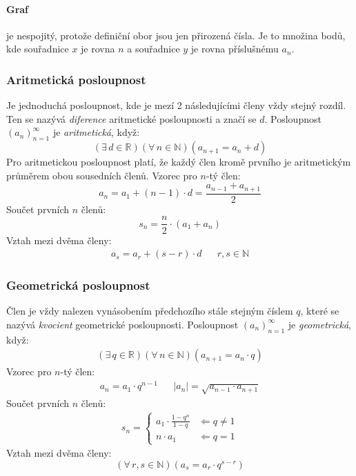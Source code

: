 \documentclass[12pt]{article}
\begin{document}
\paragraph{Graf} je nespojitý, protože definiční obor jsou jen přirozená čísla. Je to množina bodů, kde souřadnice $x$ je rovna $n$ a souřadnice $y$ je rovna příslušnému $a_n$.
\subsubsection{Aritmetická posloupnost}
Je jednoduchá posloupnost, kde je mezí 2 následujícími členy vždy stejný rozdíl. Ten se nazývá \emph{diference} aritmetické posloupnosti a značí se $d$. Posloupnost $ \left( a_n \right)_{n=1}^{\infty}$ je \emph{aritmetická}, když:
\begin{equation}
\left( \exists \, d \in \mathbb{R} \right) \left( \forall \, n \in \mathbb{N} \right) \left( a_{n+1} = a_n + d \right)
\end{equation}
Pro aritmetickou posloupnost platí, že každý člen kromě prvního je aritmetickým průměrem obou sousedních členů. Vzorec pro $n$-tý člen:
\begin{equation}
a_n = a_1 + (n-1) \cdot d = \frac{a_{n-1} + a_{n+1}}{2}
\end{equation}
Součet prvních $n$ členů:
\begin{equation}
s_n = \frac{n}{2} \cdot \left( a_1 + a_n \right)
\end{equation}
Vztah mezi dvěma členy:
\begin{align}
a_s = a_r + (s-r)\cdot d &&r,s \in \mathbb{N}
\end{align}

\subsubsection{Geometrická posloupnost}
Člen je vždy nalezen vynásobením předchozího stále stejným číslem $q$, které se nazývá \emph{kvocient} geometrické posloupnosti. Posloupnost $ \left( a_n \right)_{n=1}^{\infty}$ je \emph{geometrická}, když:
\begin{align}
\left( \exists \, q \in \mathbb{R} \right) \left(  \forall \, n \in \mathbb{N} \right) \left( a_{n+1} = a_n \cdot q \right)
\end{align}
Vzorec pro $n$-tý člen:
\begin{align}
a_n = a_1 \cdot q^{n-1}  && |a_n| = \sqrt{a_{n-1} \cdot a_{n+1}}
\end{align}
Součet prvních $n$ členů:
\begin{align}
s_n = \left\{
    \begin{array}{ll}
        a_1 \cdot \frac{1 - q^n}{1-q}  & \Leftarrow q \neq 1\\
       	n \cdot a_1 &  \Leftarrow q = 1
    \end{array}
\right.
\end{align}
Vztah mezi dvěma členy:
\begin{equation}
\left( \forall \, r,s \in \mathbb{N} \right) \left( a_s = a_r \cdot q^{s-r} \right)
\end{equation}
\end{document}
